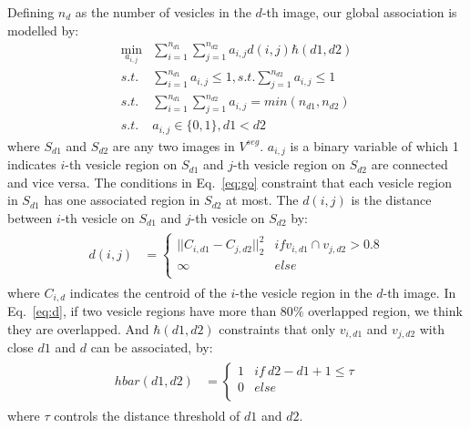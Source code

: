 Defining $n_d$ as the number of vesicles in the $d$-th image, our global association is modelled by:
\begin{eqnarray}\label{eq:go}
\min_{a_{i,j}}&\sum\limits_{i=1}^{n_{d1}}\sum\limits_{j=1}^{n_{d2}}a_{i,j}d(i,j)\hbar(d1,d2)\nonumber\\
s.t.& \sum\limits_{i=1}^{n_{d1}}a_{i,j}\leq 1, s.t. \sum\limits_{j=1}^{n_{d2}}a_{i,j}\leq 1\\
s.t.& \sum\limits_{i=1}^{n_{d1}}\sum\limits_{j=1}^{n_{d2}}a_{i,j}=min(n_{d1},n_{d2})\nonumber\\
s.t.& a_{i,j}\in \{0,1\}, d1<d2\nonumber
\end{eqnarray}
where $S_{d1}$ and $S_{d2}$ are any two images in $V^{seg}$.
$a_{i,j}$ is a binary variable of which 1 indicates $i$-th vesicle region on $S_{d1}$ and $j$-th vesicle region on $S_{d2}$ are connected and vice versa.
The conditions in Eq.~\ref{eq:go} constraint that each vesicle region in $S_{d1}$ has one associated region in $S_{d2}$ at most.
The $d(i,j)$ is the distance between $i$-th vesicle on $S_{d1}$ and $j$-th vesicle on $S_{d2}$ by:
\begin{eqnarray}\label{eq:d}
\begin{aligned}
d(i,j)&=\left\{\begin{array}{cc}
||C_{i,d1}-C_{j,d2}||_2^2&if v_{i,d1}\cap v_{j,d2}>0.8  \\
\infty & else\\
\end{array}\right.
\end{aligned}
\end{eqnarray}
where $C_{i,d}$ indicates the centroid of the $i$-the vesicle region in the $d$-th image.
In Eq.~\ref{eq:d}, if two vesicle regions have more than 80$\%$ overlapped region, we think they are overlapped.
And $\hbar(d1,d2)$ constraints that only $v_{i,d1}$ and $v_{j,d2}$ with close $d1$ and $d$ can be associated, by:
 \begin{eqnarray}\label{eq:hb}
\begin{aligned}
hbar(d1,d2)&=\left\{\begin{array}{cc}
1&if~d2-d1+1\leq \tau  \\
0 & else\\
\end{array}\right.
\end{aligned}
\end{eqnarray}
where $\tau$ controls the distance threshold of $d1$ and $d2$.

